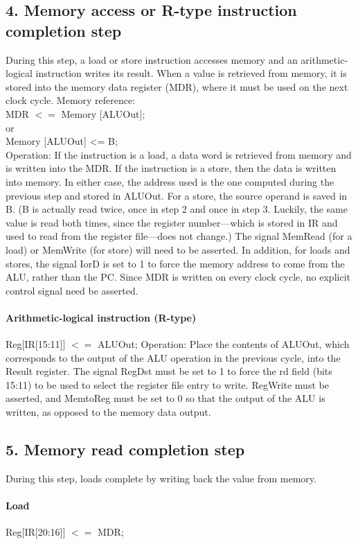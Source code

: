 \documentclass[12pt, a4paper, openany]{book}
\begin{document}
\subsection{4. Memory access or R-type instruction completion step}
During this step, a load or store instruction accesses memory and an arithmetic-logical
instruction writes its result. When a value is retrieved from memory, it is
stored into the memory data register (MDR), where it must be used on the next
clock cycle.
Memory reference:
\\ MDR $ <= $ Memory [ALUOut];
\\ or
\\ Memory [ALUOut] <= B;
\\ Operation: If the instruction is a load, a data word is retrieved from memory and
is written into the MDR. If the instruction is a store, then the data is written into
memory. In either case, the address used is the one computed during the previous
step and stored in ALUOut. For a store, the source operand is saved in B. (B is
actually read twice, once in step 2 and once in step 3. Luckily, the same value is
read both times, since the register number—which is stored in IR and used to read
from the register file—does not change.) The signal MemRead (for a load) or
MemWrite (for store) will need to be asserted. In addition, for loads and stores,
the signal IorD is set to 1 to force the memory address to come from the ALU,
rather than the PC. Since MDR is written on every clock cycle, no explicit control
signal need be asserted.
\paragraph*{Arithmetic-logical instruction (R-type)}
Reg[IR[15:11]] $<=$ ALUOut;
Operation: Place the contents of ALUOut, which corresponds to the output of the
ALU operation in the previous cycle, into the Result register. The signal RegDst
must be set to 1 to force the rd field (bits 15:11) to be used to select the register file
entry to write. RegWrite must be asserted, and MemtoReg must be set to 0 so that
the output of the ALU is written, as opposed to the memory data output.

\subsection*{5. Memory read completion step}
During this step, loads complete by writing back the value from memory.
\paragraph*{Load}
Reg[IR[20:16]] $<=$ MDR;
\end{document}
